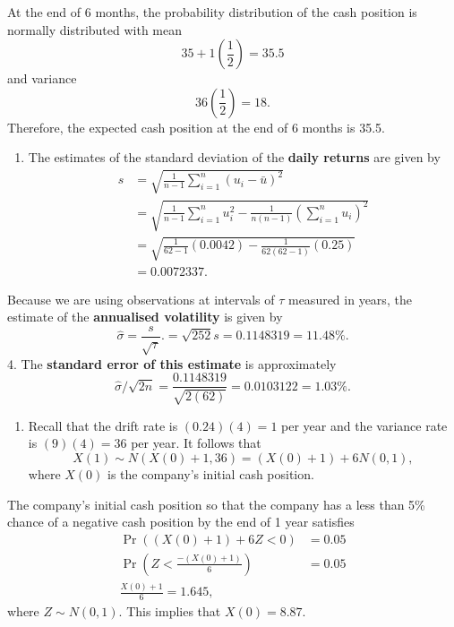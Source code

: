 \documentclass[
]{book}
\providecommand{\tightlist}{%
  \setlength{\itemsep}{0pt}\setlength{\parskip}{0pt}}
\theoremstyle{definition}
\theoremstyle{definition}
\theoremstyle{definition}
\theoremstyle{definition}
\theoremstyle{remark}
\begin{document}
At the end of 6 months, the probability distribution of the cash position is normally distributed with mean
\[35 + 1(\frac{1}{2}) = 35.5\]
and variance
\[36(\frac{1}{2}) = 18.\]
Therefore, the expected cash position at the end of 6 months is 35.5.

\begin{enumerate}
\def\labelenumi{\arabic{enumi}.}
\setcounter{enumi}{2}
\tightlist
\item
  The estimates of the standard deviation of the \textbf{daily returns} are given by
  \[
  \begin{aligned}
   s &= \sqrt{\frac{1}{n-1} \sum_{i=1}^n (u_i - \bar{u})^2 } \\
       &= \sqrt{\frac{1}{n-1} \sum_{i=1}^n    u_i^2 - \frac{1}{n(n-1)}  \left(\sum_{i=1}^n u_i  \right)^2 } \\
       &= \sqrt{\frac{1}{62-1}(0.0042) - \frac{1}{62(62-1)}(0.25)   } \\
       &= 0.0072337.
  \end{aligned}
  \]
\end{enumerate}

Because we are using observations at intervals of \(\tau\) measured in years, the estimate of the \textbf{annualised volatility} is given by
\[ \hat{\sigma} = \frac{s}{\sqrt{\tau}}.= \sqrt{252}s = 0.1148319 = 11.48\%.\]
4. The \textbf{standard error of this estimate} is approximately \[\hat{\sigma}/\sqrt{2n} = \frac{0.1148319}{\sqrt{2(62)}} = 0.0103122 = 1.03\%.\]

\begin{enumerate}
\def\labelenumi{\arabic{enumi}.}
\setcounter{enumi}{4}
\tightlist
\item
  Recall that the drift rate is \((0.24)(4) = 1\) per year and the variance rate is \((9)(4) = 36\) per year. It follows that
  \[X(1) \sim N(X(0) + 1, 36) = (X(0) + 1) + 6N(0,1),\]
  where \(X(0)\) is the company's initial cash position.
\end{enumerate}

The company's initial cash position so that the company has a less than 5\% chance of a negative cash position by the end of 1 year satisfies
\[
\begin{aligned}
\Pr((X(0) + 1) + 6Z < 0) &= 0.05 \\
\Pr( Z < \frac{-(X(0) + 1)}{6}) &= 0.05 \\
\frac{X(0) + 1}{6} = 1.645,
\end{aligned}\]
where \(Z \sim N(0,1)\).
This implies that \(X(0) = 8.87.\)
\end{document}
